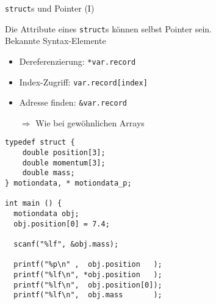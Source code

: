 \begin{frame}[fragile]{\texttt{struct}s und Pointer (I)}
%
\begin{tcbraster}[raster columns=2,
                  raster equal height,
                  nobeforeafter
                 ]
\begin{tcolorbox}[title=Records mit Array-Type]
\small
Die Attribute eines \texttt{struct}s können selbst Pointer sein.\\
\Thus Bekannte Syntax-Elemente
\begin{itemize}
\item Dereferenzierung: \newline
	\texttt{*var.record}
\item Index-Zugriff: \newline
	\texttt{var.record[index]}
\item Adresse finden: \newline
	\texttt{\&var.record}
\item[$\Rightarrow$] Wie bei gewöhnlichen Arrays
\end{itemize}
\end{tcolorbox}
%
\begin{codebox}[Code]
\begin{verbatim}
typedef struct {
    double position[3];
    double momentum[3];
    double mass;
} motiondata, * motiondata_p;

int main () {
  motiondata obj;
  obj.position[0] = 7.4;

  scanf("%lf", &obj.mass);

  printf("%p\n" ,  obj.position   );
  printf("%lf\n", *obj.position   );
  printf("%lf\n",  obj.position[0]);
  printf("%lf\n",  obj.mass       );
\end{verbatim}
\end{codebox}
\end{tcbraster}
%
\end{frame}


